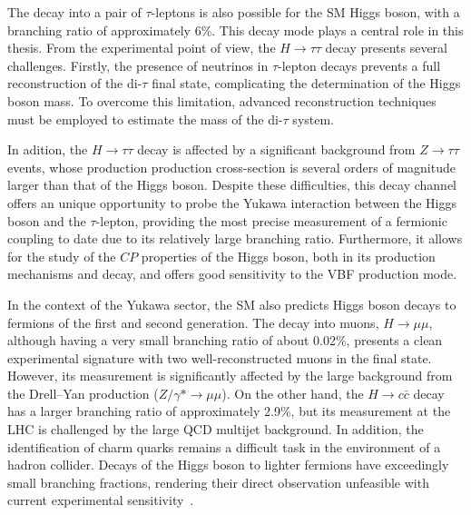 The decay into a pair of $\tau$-leptons is also possible for the SM Higgs boson, with a branching ratio of approximately 6\%. This decay mode plays a central role in this thesis. From the experimental point of view, the $H \rightarrow \tau\tau$ decay presents several challenges. Firstly, the presence of neutrinos in $\tau$-lepton decays prevents a full reconstruction of the di-$\tau$ final state, complicating the determination of the Higgs boson mass. To overcome this limitation, advanced reconstruction techniques must be employed to estimate the mass of the di-$\tau$ system.

In adition, the $H \rightarrow \tau\tau$ decay is affected by a significant background from $Z \rightarrow \tau\tau$ events, whose production production cross-section is several orders of magnitude larger than that of the Higgs boson. Despite these difficulties, this decay channel offers an unique opportunity to probe the Yukawa interaction between the Higgs boson and the $\tau$-lepton, providing the most precise measurement of a fermionic coupling to date due to its relatively large branching ratio. Furthermore, it allows for the study of the $CP$ properties of the Higgs boson, both in its production mechanisms and decay, and offers good sensitivity to the VBF production mode.

In the context of the Yukawa sector, the SM also predicts Higgs boson decays to fermions of the first and second generation. The decay into muons, \( H \rightarrow \mu\mu \), although having a very small branching ratio of about 0.02\%, presents a clean experimental signature with two well-reconstructed muons in the final state. However, its measurement is significantly affected by the large background from the Drell--Yan production ($Z/\gamma* \to \mu \mu$). On the other hand, the \( H \rightarrow c\bar{c} \) decay has a larger branching ratio of approximately 2.9\%, but its measurement at the LHC is challenged by the large QCD multijet background. In addition, the identification of charm quarks remains a difficult task in the environment of a hadron collider. Decays of the Higgs boson to lighter fermions have exceedingly small branching fractions, rendering their direct observation unfeasible with current experimental sensitivity~\cite{https://doi.org/10.23731/cyrm-2017-002}.

